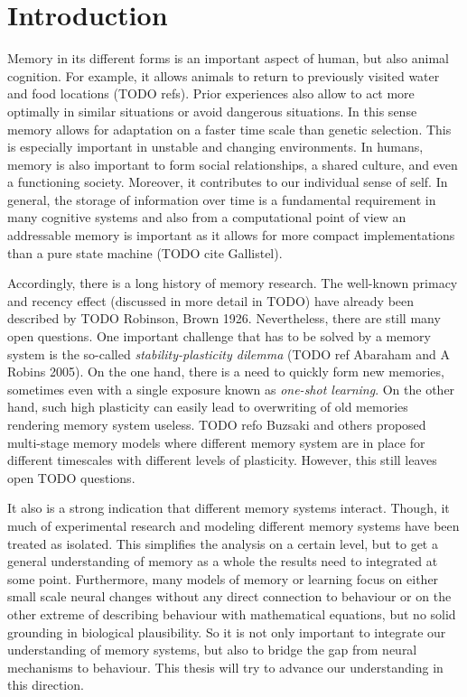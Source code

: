 \chapter{Introduction}

Memory in its different forms is an important aspect of human, but also animal cognition.
For example, it allows animals to return to previously visited water and food locations (TODO refs).
Prior experiences also allow to act more optimally in similar situations or avoid dangerous situations.
In this sense memory allows for adaptation on a faster time scale than genetic selection.
This is especially important in unstable and changing environments.
In humans, memory is also important to form social relationships, a shared culture, and even a functioning society.
Moreover, it contributes to our individual sense of self.
In general, the storage of information over time is a fundamental requirement in many cognitive systems and also from a computational point of view an addressable memory is important as it allows for more compact implementations than a pure state machine (TODO cite Gallistel).

Accordingly, there is a long history of memory research.
The well-known primacy and recency effect (discussed in more detail in TODO) have already been described by TODO Robinson, Brown 1926.
Nevertheless, there are still many open questions.
One important challenge that has to be solved by a memory system is the so-called \emph{stability-plasticity dilemma} (TODO ref Abaraham and A Robins 2005).
On the one hand, there is a need to quickly form new memories, sometimes even with a single exposure known as \emph{one-shot learning}.
On the other hand, such high plasticity can easily lead to overwriting of old memories rendering memory system useless.
TODO refo Buzsaki and others proposed multi-stage memory models where different memory system are in place for different timescales with different levels of plasticity.
However, this still leaves open TODO questions.

It also is a strong indication that different memory systems interact.
Though, it much of experimental research and modeling different memory systems have been treated as isolated.
This simplifies the analysis on a certain level, but to get a general understanding of memory as a whole the results need to integrated at some point.
Furthermore, many models of memory or learning focus on either small scale neural changes without any direct connection to behaviour or on the other extreme of describing behaviour with mathematical equations, but no solid grounding in biological plausibility.
So it is not only important to integrate our understanding of memory systems, but also to bridge the gap from neural mechanisms to behaviour.
This thesis will try to advance our understanding in this direction.

